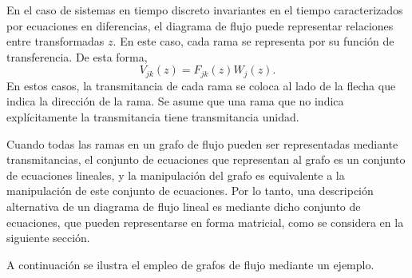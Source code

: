 \documentclass[a4paper]{report}
\begin{document}
En el caso de sistemas en tiempo discreto invariantes en el tiempo caracterizados por ecuaciones en diferencias, el diagrama de flujo puede representar relaciones entre transformadas \(z\). En este caso, cada rama se representa por su función de transferencia. De esta forma,
\[
 V_{jk}(z)=F_{jk}(z)W_j(z).
\]
En estos casos, la transmitancia de cada rama se coloca al lado de la flecha  que indica la dirección de la rama. Se asume que una rama que no indica explícitamente la transmitancia tiene transmitancia unidad.

Cuando todas las ramas en un grafo de flujo pueden ser representadas mediante transmitancias, el conjunto de ecuaciones que representan al grafo es un conjunto de ecuaciones lineales, y la manipulación del grafo es equivalente a la manipulación de este conjunto de ecuaciones. Por lo tanto, una descripción alternativa de un diagrama de flujo lineal es mediante dicho conjunto de ecuaciones, que pueden representarse en forma matricial, como se considera en la siguiente sección.

A continuación se ilustra el empleo de grafos de flujo mediante un ejemplo. 
 
\end{document}
